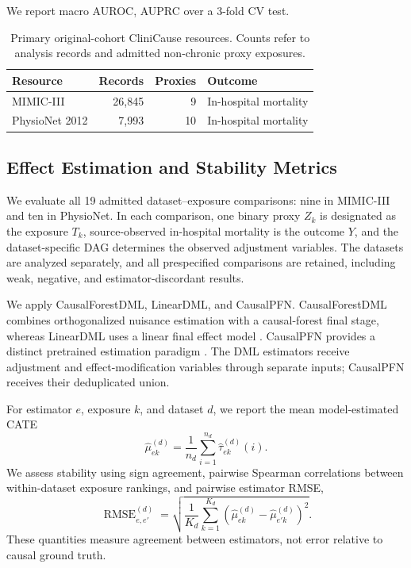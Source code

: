 \documentclass[letterpaper]{article}
\begin{document}
We report macro AUROC, AUPRC over a 3-fold CV test. 


\begin{table}[t]
  \centering
  \small
  \begin{tabular}{@{}lrrl@{}}
    \toprule
    Resource & Records & Proxies & Outcome \\
    \midrule
    MIMIC-III & 26,845 & 9 & In-hospital mortality \\
    PhysioNet 2012 & 7,993 & 10 & In-hospital mortality \\
    \bottomrule
  \end{tabular}
  \caption{Primary original-cohort CliniCause resources. Counts refer to
  analysis records and admitted non-chronic proxy exposures.}
  \label{tab:resources}
\end{table}


\subsection{Effect Estimation and Stability Metrics}

We evaluate all 19 admitted dataset--exposure comparisons: nine in MIMIC-III
and ten in PhysioNet. In each comparison, one binary proxy \(Z_k\) is designated
as the exposure \(T_k\), source-observed in-hospital mortality is the outcome
\(Y\), and the dataset-specific DAG determines the observed adjustment
variables. The datasets are analyzed separately, and all prespecified
comparisons are retained, including weak, negative, and estimator-discordant
results.

We apply CausalForestDML, LinearDML, and CausalPFN. CausalForestDML combines
orthogonalized nuisance estimation with a causal-forest final stage, whereas
LinearDML uses a linear final effect model
\cite{chernozhukov2018dml,wager2018causalforest,athey2019grf,
oprescu_et_al_2019_econml}. CausalPFN provides a distinct pretrained estimation
paradigm \cite{balazadeh2025causalpfn}. The DML estimators receive adjustment
and effect-modification variables through separate inputs; CausalPFN receives
their deduplicated union.

For estimator \(e\), exposure \(k\), and dataset \(d\), we report the mean
model-estimated CATE
\[
\widehat{\mu}_{ek}^{(d)}
=
\frac{1}{n_d}\sum_{i=1}^{n_d}
\widehat{\tau}_{ek}^{(d)}(i).
\]
We assess stability using sign agreement, pairwise Spearman correlations between
within-dataset exposure rankings, and pairwise estimator RMSE,
\[
\operatorname{RMSE}_{e,e'}^{(d)}
=
\sqrt{
\frac{1}{K_d}
\sum_{k=1}^{K_d}
\left(
\widehat{\mu}_{ek}^{(d)}-\widehat{\mu}_{e'k}^{(d)}
\right)^2
}.
\]
These quantities measure agreement between estimators, not error relative to
causal ground truth.
\end{document}
